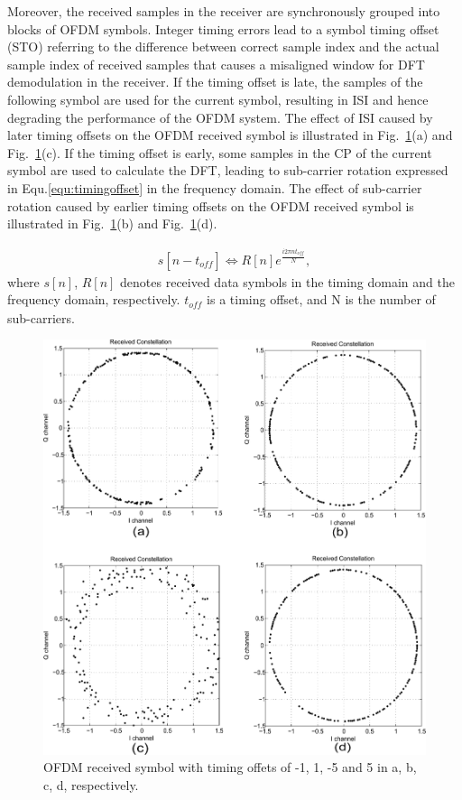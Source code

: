 Moreover, the received samples in the receiver are synchronously grouped into blocks of OFDM symbols.
Integer timing errors lead to a symbol timing offset (STO) referring to the difference between correct sample index and the actual sample index of received samples that causes a misaligned window for DFT demodulation in the receiver.
If the timing offset is late, the samples of the following symbol are used for the current symbol, resulting in ISI and hence degrading the performance of the OFDM system. The effect of ISI caused by later timing offsets on the OFDM received symbol is illustrated in Fig.~\ref{fig:Timingoffsetconstellation}(a) and Fig.~\ref{fig:Timingoffsetconstellation}(c).
If the timing offset is early, some samples in the CP of the current symbol are used to calculate the DFT, leading to sub-carrier rotation expressed in Equ.\ref{equ:timingoffset} in the frequency domain.  
The effect of sub-carrier rotation caused by earlier timing offsets on the OFDM received symbol is illustrated in Fig.~\ref{fig:Timingoffsetconstellation}(b) and Fig.~\ref{fig:Timingoffsetconstellation}(d).

\begin{eqnarray}
\label{equ:rotationcompensation}
              s[n - \mathit{t_{off}}]  \Leftrightarrow R[n] e^{\frac{i2\pi n \mathit{t_{off}}}{N}},
\end{eqnarray}
where $s[n]$, $R[n]$ denotes received data symbols in the timing domain and the frequency domain, respectively. $\mathit{t_{off}}$ is a timing offset, and N is the number of sub-carriers.

\begin{figure}
	\centerline{\includegraphics [width=0.8\columnwidth] {Figures/timeoff.pdf} }
	\caption{OFDM received symbol with timing offets of -1, 1, -5 and 5 in a, b, c, d, respectively.}
	\label{fig:Timingoffsetconstellation}
\end{figure}

